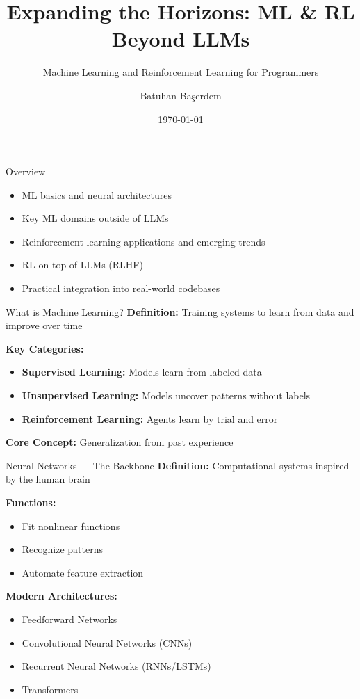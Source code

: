 \documentclass[aspectratio=169]{beamer}
\title{Expanding the Horizons: ML \& RL Beyond LLMs}
\subtitle{Machine Learning and Reinforcement Learning for Programmers}
\author{Batuhan Başerdem}
\date{\today}
\begin{document}
\frame{\titlepage}

\begin{frame}{Overview}
  \begin{itemize}
    \item ML basics and neural architectures
    \item Key ML domains outside of LLMs
    \item Reinforcement learning applications and emerging trends
    \item RL on top of LLMs (RLHF)
    \item Practical integration into real-world codebases
  \end{itemize}
\end{frame}

\begin{frame}{What is Machine Learning?}
  \textbf{Definition:} Training systems to learn from data and improve over time

  \vspace{0.5cm}
  \textbf{Key Categories:}
  \begin{itemize}
    \item \textbf{Supervised Learning:} Models learn from labeled data
    \item \textbf{Unsupervised Learning:} Models uncover patterns without labels
    \item \textbf{Reinforcement Learning:} Agents learn by trial and error
  \end{itemize}

  \vspace{0.5cm}
  \textbf{Core Concept:} Generalization from past experience
\end{frame}

\begin{frame}{Neural Networks — The Backbone}
  \textbf{Definition:} Computational systems inspired by the human brain

  \vspace{0.3cm}
  \textbf{Functions:}
  \begin{itemize}
    \item Fit nonlinear functions
    \item Recognize patterns
    \item Automate feature extraction
  \end{itemize}

  \vspace{0.3cm}
  \textbf{Modern Architectures:}
  \begin{itemize}
    \item Feedforward Networks
    \item Convolutional Neural Networks (CNNs)
    \item Recurrent Neural Networks (RNNs/LSTMs)
    \item Transformers
  \end{itemize}
\end{frame}
\end{document}

